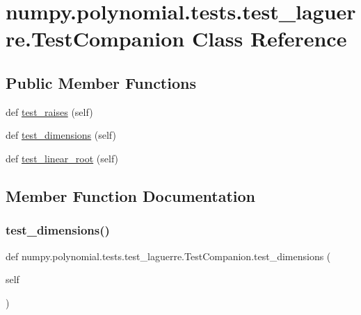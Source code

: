 \hypertarget{classnumpy_1_1polynomial_1_1tests_1_1test__laguerre_1_1TestCompanion}{}\section{numpy.\+polynomial.\+tests.\+test\+\_\+laguerre.\+Test\+Companion Class Reference}
\label{classnumpy_1_1polynomial_1_1tests_1_1test__laguerre_1_1TestCompanion}
\subsection*{Public Member Functions}
\begin{DoxyCompactItemize}
\item 
def \hyperlink{classnumpy_1_1polynomial_1_1tests_1_1test__laguerre_1_1TestCompanion_a93b1038d84fcad4eb747a2acf85d2d97}{test\+\_\+raises} (self)
\item 
def \hyperlink{classnumpy_1_1polynomial_1_1tests_1_1test__laguerre_1_1TestCompanion_a4fb7059486625e335a6f67021c1ccf66}{test\+\_\+dimensions} (self)
\item 
def \hyperlink{classnumpy_1_1polynomial_1_1tests_1_1test__laguerre_1_1TestCompanion_aff29ed9f7d1ab033f00b25fa643f6d21}{test\+\_\+linear\+\_\+root} (self)
\end{DoxyCompactItemize}


\subsection{Member Function Documentation}
\mbox{\label{classnumpy_1_1polynomial_1_1tests_1_1test__laguerre_1_1TestCompanion_a4fb7059486625e335a6f67021c1ccf66}} 
\subsubsection{\texorpdfstring{test\+\_\+dimensions()}{test\_dimensions()}}
{\footnotesize\ttfamily def numpy.\+polynomial.\+tests.\+test\+\_\+laguerre.\+Test\+Companion.\+test\+\_\+dimensions (\begin{DoxyParamCaption}\item[{}]{self }\end{DoxyParamCaption})}

